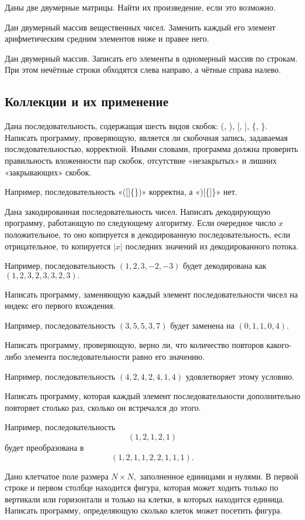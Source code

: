 \task Даны две двумерные матрицы. Найти их произведение, если это
возможно.

\task Дан двумерный массив вещественных чисел. Заменить каждый его
элемент арифметическим средним элементов ниже и правее него.

\task Дан двумерный массив. Записать его элементы в одномерный массив
по строкам. При этом нечётные строки обходятся слева направо, а чётные
справа налево.

\subsection{Коллекции и их применение}

\task Дана последовательность, содержащая шесть видов скобок: (, ), [,
], \{, \}. Написать программу, проверяющую, является ли скобочная
запись, задаваемая последовательностью, корректной. Иными словами,
программа должна проверить правильность вложенности пар скобок,
отсутствие «незакрытых» и лишних «закрывающих» скобок.

Например, последовательность «([]\{\})» корректна, а «)[\{]\}» нет.

\task Дана закодированная последовательность чисел. Написать
декодирующую программу, работающую по следующему алгоритму. Если
очередное число $x$ положительное, то оно копируется в декодированную
последовательность, если отрицательное, то копируется $|x|$ последних
значений из декодированного потока.

Например, последовательность $(1, 2, 3, -2, -3)$ будет декодирована как
$(1, 2, 3, 2, 3, 3, 2, 3).$

\task Написать программу, заменяющую каждый элемент последовательности
чисел на индекс его первого вхождения.

Например, последовательность $(3, 5, 5, 3, 7)$ будет заменена на
$(0, 1, 1, 0, 4).$

\task Написать программу, проверяющую, верно ли, что количество
повторов какого-либо элемента последовательности равно его значению.

Например, последовательность $(4, 2, 4, 2, 4, 1, 4)$ удовлетворяет
этому условию.

\task Написать программу, которая каждый элемент последовательности
дополнительно повторяет столько раз, сколько он встречался до этого.

Например, последовательность
\[
(1, 2, 1, 2, 1)
\]
будет преобразована в 
\[
(1, 2, 1, 1, 2, 2, 1, 1, 1).
\]

\task Дано клетчатое поле размера $N\times N,$ заполненное единицами и
нулями. В первой строке и первом столбце находится фигура, которая
может ходить только по вертикали или горизонтали и только на клетки, в
которых находится единица. Написать программу, определяющую сколько
клеток может посетить фигура.

